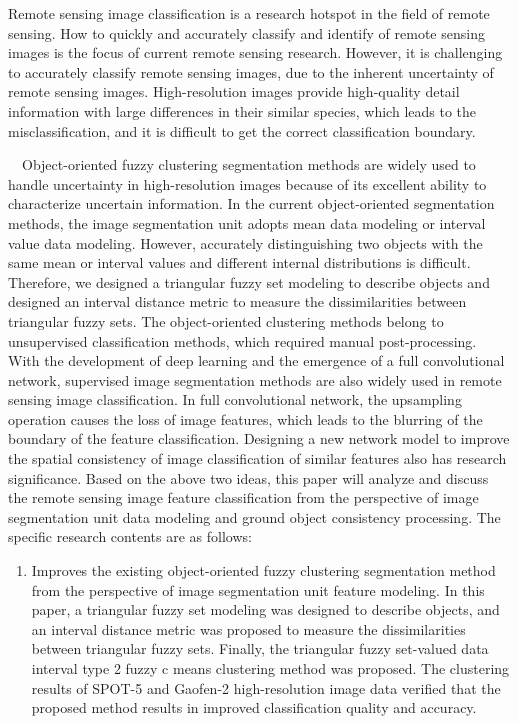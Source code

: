 
\begin{eabstract}
  Remote sensing image classification is a research hotspot in the field of remote sensing. How to quickly and accurately classify and identify  of remote sensing images is the focus of current remote sensing research. However, it is challenging to accurately classify remote sensing images, due to the inherent uncertainty of remote sensing images. High-resolution images provide high-quality detail information with large differences in their similar species, which leads to the misclassification, and it is difficult to get the correct classification boundary.

    Object-oriented fuzzy clustering segmentation methods are widely used to handle uncertainty in high-resolution images because of its excellent ability to characterize uncertain information. In the current object-oriented segmentation methods, the image segmentation unit adopts mean data modeling or interval value data modeling. However, accurately distinguishing
  two objects with the same mean or interval values and different internal distributions is difficult. Therefore, we designed a triangular fuzzy set modeling to describe objects and designed an interval distance metric to measure the dissimilarities between triangular fuzzy sets. The object-oriented clustering methods belong to unsupervised classification methods, which required manual post-processing. With the development of deep learning and the emergence of a full convolutional network, supervised image segmentation methods are also widely used in remote sensing image classification. In full convolutional network, the upsampling operation causes the loss of image features, which leads to the blurring of the boundary of the feature classification. Designing a new network model to improve the spatial consistency of image classification of similar features also has research significance. Based on the above two ideas, this paper will analyze and discuss the remote sensing image feature classification from the perspective of image segmentation unit data modeling and ground object consistency processing. The specific research contents are as follows:
\begin{enumerate}[(1)]
  \item Improves the existing object-oriented fuzzy clustering segmentation method from the perspective of image segmentation unit feature modeling. In this paper, a triangular fuzzy set modeling was designed to describe objects, and an interval distance metric was proposed to measure the dissimilarities between triangular fuzzy sets. Finally, the triangular fuzzy set-valued data interval type 2  fuzzy c means clustering method was proposed. The clustering results of SPOT-5 and Gaofen-2 high-resolution image data verified that the proposed method results in improved classification quality and accuracy.

\end{enumerate}
\end{eabstract}

